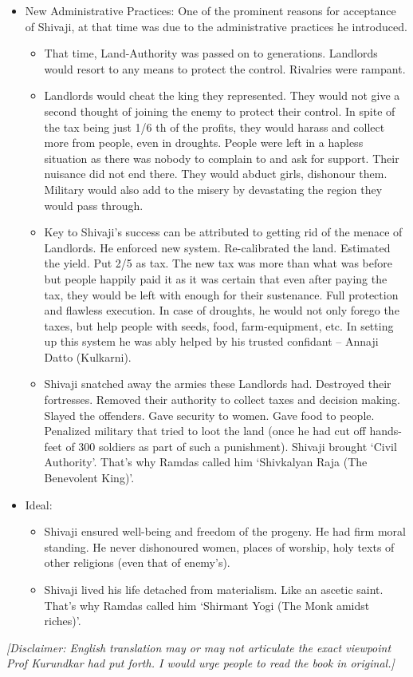 \begin{itemize}[noitemsep,nolistsep]
\item New Administrative Practices: One of the prominent reasons for acceptance of Shivaji, at that time was due to the administrative practices he introduced.
	\begin{itemize}[noitemsep,nolistsep]
	\item That time, Land-Authority was passed on to generations. Landlords would resort to any means to protect the control. Rivalries were rampant.
	\item Landlords would cheat the king they represented. They would not give a second thought of joining the enemy to protect their control. In spite of the tax being just 1/6 th of the profits, they would harass and collect more from people, even in droughts. People were left in a hapless situation as there was nobody to complain to and ask for support. Their nuisance did not end there. They would abduct girls, dishonour them. Military would also add to the misery by devastating the region they would pass through.
	\item Key to Shivaji’s success can be attributed to getting rid of the menace of Landlords. He enforced new system. Re-calibrated the land. Estimated the yield. Put 2/5 as tax. The new tax was more than what was before but people happily paid it as it was certain that even after paying the tax, they would be left with enough for their sustenance.  Full protection and flawless execution. In case of droughts, he would not only forego the taxes, but help people with seeds, food, farm-equipment, etc. In setting up this system he was ably helped by his trusted confidant – Annaji Datto (Kulkarni). 
	\item Shivaji snatched away the armies these Landlords had. Destroyed their fortresses. Removed their authority to collect taxes and decision making. Slayed the offenders. Gave security to women. Gave food to people. Penalized military that tried to loot the land (once he had cut off hands-feet of 300 soldiers as part of such a punishment). Shivaji brought ‘Civil Authority’. That’s why Ramdas called him ‘Shivkalyan Raja (The Benevolent King)’.
	\end{itemize}

\item Ideal:
	\begin{itemize}[noitemsep,nolistsep]
	\item Shivaji ensured well-being and freedom of the progeny. He had firm moral standing. He never dishonoured women, places of worship, holy texts of other religions (even that of enemy’s).
	\item Shivaji lived his life detached from materialism. Like an ascetic saint. That’s why Ramdas called him ‘Shirmant Yogi (The Monk amidst riches)’.
	\end{itemize}

\end{itemize}

{\em [Disclaimer: English translation may or may not articulate the exact viewpoint Prof Kurundkar had put forth. I would urge people to read the book in original.]}

